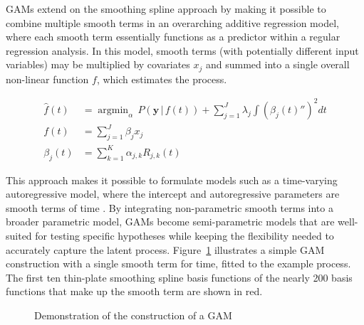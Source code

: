 \documentclass[man, floatsintext]{apa7}
\DeclareMathOperator*{\argmin}{argmin}
\begin{document}
GAMs extend on the smoothing spline approach by making it possible to combine
multiple smooth terms in an overarching additive regression model, where each
smooth term essentially functions as a predictor within a regular regression
analysis. In this model, smooth terms (with potentially different input
variables) may be multiplied by covariates $x_j$ and
summed into a single overall non-linear function $f$, which estimates the
process.

\begin{equation}
  \begin{aligned}
    \hat{f}(t) & = \argmin_\alpha \, P(\textbf{y} \, | \, f(t)) +
    \sum_{j = 1}^{J} \lambda_j \int {(\beta_j(t)'')}^2 dt         \\
    f(t)       & = \sum_{j = 1}^{J} \beta_j x_j                   \\
    \beta_j(t) & = \sum^K_{k = 1} \alpha_{j,k} R_{j, k}(t)
  \end{aligned}
\end{equation}

\noindent This approach makes it possible to formulate models such
as a time-varying autoregressive model, where the intercept and autoregressive
parameters are smooth terms of time \parencite{bringmann_changing_2017,
  bringmann_modeling_2015}. By integrating non-parametric smooth terms into a
broader parametric model, GAMs become semi-parametric models that are
well-suited for testing specific hypotheses while keeping the flexibility
needed to accurately capture the latent process. Figure~\ref{fig:gam_dem}
illustrates a simple GAM construction with a single smooth term for time,
fitted to the example process. The first ten thin-plate smoothing spline basis
functions of the nearly 200 basis functions that make up the smooth term are
shown in red.

\begin{figure}[!t]
  \caption{Demonstration of the construction of a GAM}
  \label{fig:gam_dem}
\end{figure}
\end{document}
